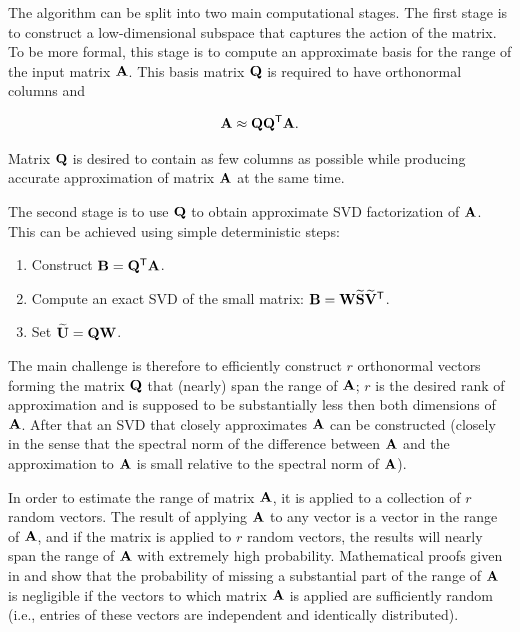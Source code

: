 The algorithm can be split into two main computational stages. The first stage is to construct a low-dimensional subspace that captures the action of the matrix. To be more formal, this stage is to compute an approximate basis for the range of the input matrix $\mathbf{A}$. This basis matrix $\mathbf{Q}$ is required to have orthonormal columns and

\begin{equation}
\mathbf{A} \approx \mathbf{Q} \mathbf{Q}^{\mathsf{T}} \mathbf{A}.
\end{equation}

\noindent
Matrix $\mathbf{Q}$ is desired to contain as few columns as possible while producing accurate approximation of matrix $\mathbf{A}$ at the same time.

The second stage is to use $\mathbf{Q}$ to obtain approximate SVD factorization of $\mathbf{A}$. This can be achieved using simple deterministic steps:

\begin{enumerate}
\item Construct $\mathbf{B} = \mathbf{Q}^{\mathsf{T}} \mathbf{A}$.
\item Compute an exact SVD of the small matrix: $\mathbf{B}=\mathbf{W}\mathbf{\widetilde{S}}\mathbf{\widetilde{V}}^{\mathsf{T}}$.
\item Set $\mathbf{\widetilde{U}}=\mathbf{Q}\mathbf{W}$.
\end{enumerate}

The main challenge is therefore to efficiently construct $r$ orthonormal vectors forming the matrix $\mathbf{Q}$ that (nearly) span the range of $\mathbf{A}$; $r$ is the desired rank of approximation and is supposed to be substantially less then both dimensions of $\mathbf{A}$. After that an SVD that closely approximates $\mathbf{A}$ can be constructed (closely in the sense that the spectral norm of the difference between $\mathbf{A}$ and the approximation to $\mathbf{A}$ is small relative to the spectral norm of $\mathbf{A}$).

In order to estimate the range of matrix $\mathbf{A}$, it is applied to a collection of $r$ random vectors. The result of applying $\mathbf{A}$ to any vector is a vector in the range of $\mathbf{A}$, and if the matrix is applied to $r$ random vectors, the results will nearly span the range of $\mathbf{A}$ with extremely high probability. Mathematical proofs given in \cite{Halko2011} and \cite{Witten2015} show that the probability of missing a substantial part of the range of $\mathbf{A}$ is negligible if the vectors to which matrix $\mathbf{A}$ is applied are sufficiently random (i.e., entries of these vectors are independent and identically distributed).

